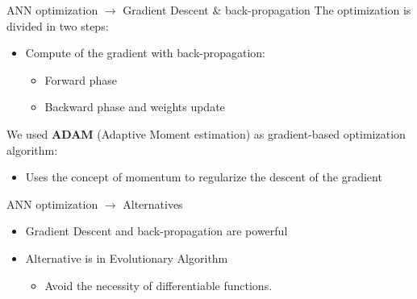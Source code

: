 \documentclass[xcolor={usenames}]{beamer}
\begin{document}
  \begin{frame}{ANN optimization \(\rightarrow\) Gradient Descent \& back-propagation}
  	The optimization is divided in two steps:
  	\begin{itemize}
  		\item{Compute of the gradient with back-propagation:
  			\begin{itemize}
  				\item{Forward phase}
  				\item{Backward phase and weights update}
  			\end{itemize}}
  	\end{itemize}
  	
  	We used \textbf{ADAM} (Adaptive Moment estimation) \cite{Kingma2014AdamAM} as gradient-based optimization algorithm:
  	\begin{itemize}
  		\item{Uses the concept of momentum to regularize the descent of the gradient}
  	\end{itemize}
  \end{frame}
  \begin{frame}{ANN optimization \(\rightarrow\) Alternatives}
  	\begin{itemize}
  		\item{Gradient Descent and back-propagation are powerful}
  		\item{Alternative is in Evolutionary Algorithm
  			\begin{itemize}
  				\item{Avoid the necessity of differentiable functions.}
  			\end{itemize}}
  	\end{itemize}
  \end{frame}
  \fi
\end{document}
